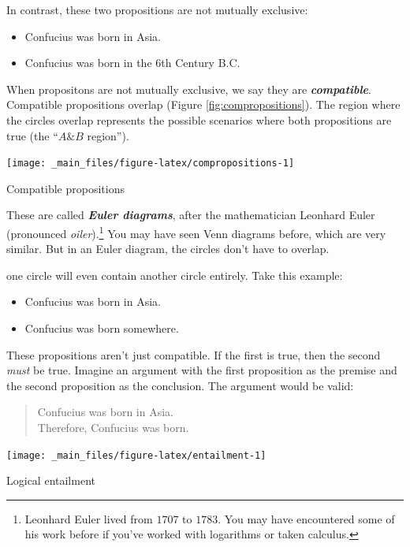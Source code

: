 \documentclass[justified]{tufte-book}
\providecommand{\tightlist}{%
  \setlength{\itemsep}{0pt}\setlength{\parskip}{0pt}}
\renewcommand{\wedge}{\mathbin{\&}}
\newenvironment{argument}{\begin{quote}\normalsize}{\end{quote}}
\begin{document}
In contrast, these two propositions are not mutually exclusive:

\begin{itemize}
\tightlist
\item
  Confucius was born in Asia.
\item
  Confucius was born in the 6th Century B.C.
\end{itemize}

When propositons are not mutually exclusive, we say they are \textbf{\emph{compatible}}. Compatible propositions overlap (Figure \ref{fig:compropositions}). The region where the circles overlap represents the possible scenarios where both propositions are true (the ``\(A \wedge B\) region'').

\begin{marginfigure}
\texttt{[image: \_main\_files/figure-latex/compropositions-1]} \caption[Compatible propositions]{Compatible propositions}\label{fig:compropositions}
\end{marginfigure}

These are called \textbf{\emph{Euler diagrams}}, after the mathematician Leonhard Euler (pronounced \emph{oiler}).\footnote{Leonhard Euler lived from \(1707\) to \(1783\). You may have encountered some of his work before if you've worked with logarithms or taken calculus.} You may have seen Venn diagrams before, which are very similar. But in an Euler diagram, the circles don't have to overlap.

 one circle will even contain another circle entirely. Take this example:

\begin{itemize}
\tightlist
\item
  Confucius was born in Asia.
\item
  Confucius was born somewhere.
\end{itemize}

These propositions aren't just compatible. If the first is true, then the second \emph{must} be true. Imagine an argument with the first proposition as the premise and the second proposition as the conclusion. The argument would be valid:

\begin{argument}
Confucius was born in Asia.\\
Therefore, Confucius was born.
\end{argument}

\begin{marginfigure}
\texttt{[image: \_main\_files/figure-latex/entailment-1]} \caption[Logical entailment]{Logical entailment}\label{fig:entailment}
\end{marginfigure}
\end{document}
